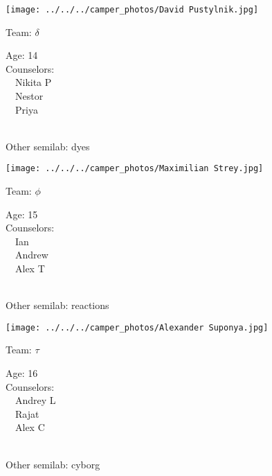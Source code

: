\documentclass[10pt,letterpaper, landscape]{article}
\begin{document}
\verticalshiftfornextsticker
\renewcommand{\baselinestretch}{1} \begin{sticker}
\noindent\begin{minipage}{0.5\textwidth}\texttt{[image: ../../../camper\_photos/David Pustylnik.jpg]}\end{minipage}\begin{minipage}{0.45\textwidth}
Team: {\Large $\delta$}

Age:        14\\
Counselors: \\\ \ Nikita P\\\ \ Nestor\\\ \ Priya\\
\end{minipage} \\ \vspace{0.07in}
Other semilab: dyes
\end{sticker}
\horizontalshiftfornextsticker
\renewcommand{\baselinestretch}{1} \begin{sticker}
\noindent\begin{minipage}{0.5\textwidth}\texttt{[image: ../../../camper\_photos/Maximilian Strey.jpg]}\end{minipage}\begin{minipage}{0.45\textwidth}
Team: {\Large $\phi$}

Age:        15\\
Counselors: \\\ \ Ian\\\ \ Andrew\\\ \ Alex T\\
\end{minipage} \\ \vspace{0.07in}
Other semilab: reactions
\end{sticker}
\horizontalshiftfornextsticker
\renewcommand{\baselinestretch}{1} \begin{sticker}
\noindent\begin{minipage}{0.5\textwidth}\texttt{[image: ../../../camper\_photos/Alexander Suponya.jpg]}\end{minipage}\begin{minipage}{0.45\textwidth}
Team: {\Large $\tau$}

Age:        16\\
Counselors: \\\ \ Andrey L\\\ \ Rajat\\\ \ Alex C\\
\end{minipage} \\ \vspace{0.07in}
Other semilab: cyborg
\end{sticker}
\end{document}
